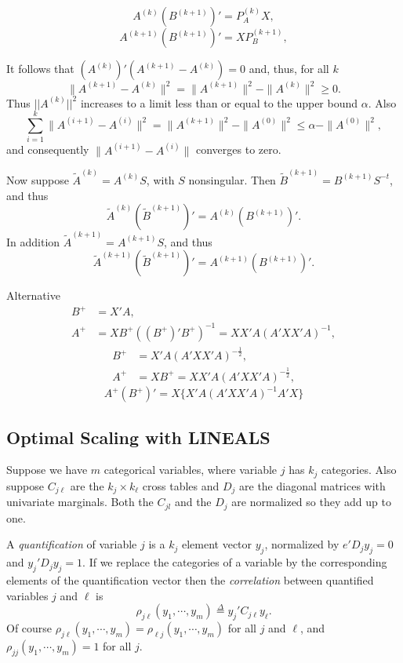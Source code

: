 \documentclass[
  12pt,
]{book}
\begin{document}
\[
A^{(k)}(B^{(k+1)})'=P_A^{(k)}X,
\]
\[
A^{(k+1)}(B^{(k+1)})'=XP_B^{(k+1)},
\]

It follows that \((A^{(k)})'(A^{(k+1)}-A^{(k)})=0\) and, thus, for all \(k\)
\[
\|A^{(k+1)}-A^{(k)}\|^2=\|A^{(k+1)}\|^2-\|A^{(k)}\|^2\geq 0.
\]
Thus \(||A^{(k)}||^2\) increases to a limit less than or equal to the upper bound \(\alpha\). Also
\[
\sum_{i=1}^k \|A^{(i+1)}-A^{(i)}\|^2=\|A^{(k+1)}\|^2-\|A^{(0)}\|^2\leq\alpha-\|A^{(0)}\|^2,
\]
and consequently \(\|A^{(i+1)}-A^{(i)}\|\) converges to zero.

Now suppose \(\tilde A^{(k)}=A^{(k)}S\), with \(S\) nonsingular. Then \(\tilde B^{(k+1)}=B^{(k+1)}S^{-t}\), and thus
\[
\tilde A^{(k)}(\tilde B^{(k+1)})'=A^{(k)} (B^{(k+1)})'.
\]
In addition \(\tilde A^{(k+1)}=A^{(k+1)}S\), and thus
\[
\tilde A^{(k+1)}(\tilde B^{(k+1)})'=A^{(k+1)} (B^{(k+1)})'.
\]

Alternative
\begin{align*}
B^+&=X'A,\\
A^+&=XB^+((B^+)'B^+)^{-1}=XX'A(A'XX'A)^{-1},
\end{align*}
\begin{align*}
B^+&=X'A(A'XX'A)^{-\frac12},\\
A^+&=XB^+=XX'A(A'XX'A)^{-\frac12},
\end{align*}
\[
A^+(B^+)'=X\{X'A(A'XX'A)^{-1}A'X\}
\]

\hypertarget{blockrelaxation:additionalexamples:optimalscalingwithlineals}{%
\subsection{Optimal Scaling with LINEALS}\label{blockrelaxation:additionalexamples:optimalscalingwithlineals}}

Suppose we have \(m\) categorical variables, where variable \(j\) has \(k_j\) categories. Also
suppose \(C_{j\ell}\) are the \(k_j\times k_\ell\) cross tables and \(D_j\) are the diagonal matrices with univariate marginals. Both the \(C_{jl}\) and the \(D_j\)
are normalized so they add up to one.

A \emph{quantification} of variable \(j\) is a \(k_j\) element vector \(y_j\), normalized by \(e'D_jy_j=0\) and \(y_j'D_j^{\ }y_j^{\ }=1\). If we replace the categories of a variable by the corresponding elements of the quantification vector then the \emph{correlation} between
quantified variables \(j\) and \(\ell\) is
\[
\rho_{j\ell}(y_1,\cdots,y_m)\mathop{=}\limits^{\Delta}y_j'C_{j\ell}^{\ }y_\ell^{\ }.
\]
Of course \(\rho_{j\ell}(y_1,\cdots,y_m)=\rho_{\ell j}(y_1,\cdots,y_m)\) for all \(j\) and \(\ell\),
and \(\rho_{jj}(y_1,\cdots,y_m)=1\) for all \(j\).
\end{document}
